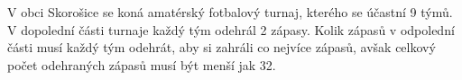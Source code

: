V obci Skorošice se koná amatérský fotbalový turnaj, kterého se účastní 9 týmů.
V dopolední části turnaje každý tým odehrál 2 zápasy. Kolik zápasů v odpolední
části musí každý tým odehrát, aby si zahráli co nejvíce zápasů, avšak celkový
počet odehraných zápasů musí být menší jak 32.
